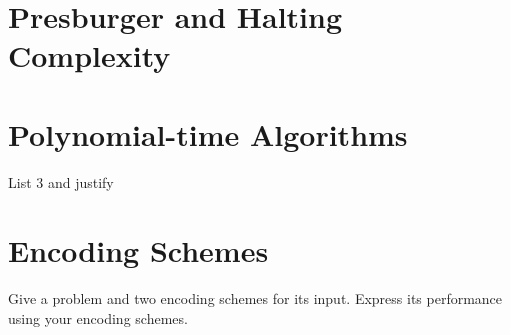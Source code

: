 \documentclass{article}
\renewcommand{\_}{\ifincsname_\else\legacyunderscore\fi}
\begin{document}
\section*{Presburger and Halting Complexity}

\section*{Polynomial-time Algorithms}

    List 3 and justify

\section*{Encoding Schemes}

    Give a problem and two encoding schemes for its input.  Express its performance using your encoding schemes.
\end{document}
